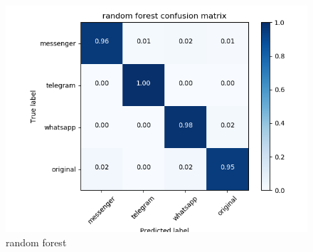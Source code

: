  \begin{figure}[H] 
\centering 
\includegraphics[scale=.6]{images/random_total.png} 
\caption{random forest} 
\end{figure} 
